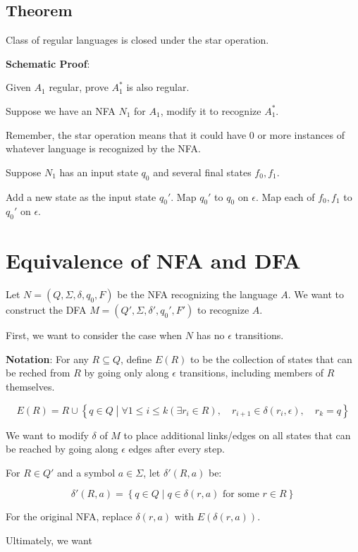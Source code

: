 \documentclass{article}
\begin{document}
\subsection*{Theorem}

Class of regular languages is closed under the star operation.

\textbf{Schematic Proof}:

Given $A_1$ regular, prove $A_1^*$ is also regular.

Suppose we have an NFA $N_1$ for $A_1$, modify it to recognize
$A_1^*$.

Remember, the star operation means that it could have $0$ or more
instances of whatever language is recognized by the NFA.

Suppose $N_1$ has an input state $q_0$ and several final states
$f_0,f_1$.

Add a new state as the input state $q_0'$. Map $q_0'$ to $q_0$ on
$\epsilon$. Map each of $f_0,f_1$ to $q_0'$ on $\epsilon$.

\section*{Equivalence of NFA and DFA}

Let $N=(Q,\Sigma,\delta,q_0,F)$ be the NFA recognizing the language
$A$. We want to construct the DFA $M=(Q',\Sigma,\delta',q_0',F')$ to
recognize $A$.

First, we want to consider the case when $N$ has no $\epsilon$
transitions.

\textbf{Notation}: For any $R\subseteq{}Q$, define $E(R)$ to be the
collection of states that can be reched from $R$ by going only along
$\epsilon$ transitions, including members of $R$ themselves.

\[
E(R)=R\cup\left\{q\in{}Q\middle|\forall 1\le{}i\le{}k(\exists{}r_i\in{}R),\quad r_{i+1}\in\delta(r_i,\epsilon),\quad r_k=q\right\}
\]

We want to modify $\delta$ of $M$ to place additional links/edges on
all states that can be reached by going along $\epsilon$ edges after
every step.

For $R\in{}Q'$ and a symbol $a\in\Sigma$, let $\delta'(R,a)$ be:

\[
\delta'(R,a)=\left\{q\in{}Q\middle|q\in\delta(r,a)\text{ for some }r\in{}R\right\}
\]

For the original NFA, replace $\delta(r,a)$ with $E(\delta(r,a))$.

Ultimately, we want
\end{document}
